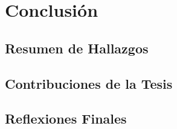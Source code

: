 \documentclass[../Main.tex]{subfiles}
\begin{document}
\section{Conclusión}

\subsection{Resumen de Hallazgos}
\lipsum[1] %

\subsection{Contribuciones de la Tesis}
\lipsum[2] %

\subsection{Reflexiones Finales}
\lipsum[3] %

\biblio
\end{document}
